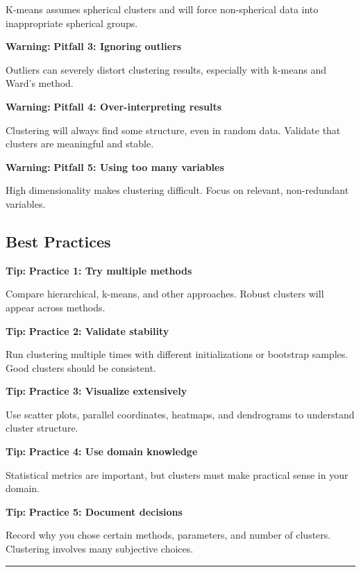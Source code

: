 \documentclass[
]{article}
\begin{document}
K-means assumes spherical clusters and will force non-spherical data
into inappropriate spherical groups.

\textbf{Warning: } \textbf{Pitfall 3: Ignoring outliers}

Outliers can severely distort clustering results, especially with
k-means and Ward's method.

\textbf{Warning: } \textbf{Pitfall 4: Over-interpreting results}

Clustering will always find some structure, even in random data.
Validate that clusters are meaningful and stable.

\textbf{Warning: } \textbf{Pitfall 5: Using too many variables}

High dimensionality makes clustering difficult. Focus on relevant,
non-redundant variables.

\textbf{ }

\subsection{Best Practices}

\textbf{Tip: } \textbf{Practice 1: Try multiple methods}

Compare hierarchical, k-means, and other approaches. Robust clusters
will appear across methods.

\textbf{Tip: } \textbf{Practice 2: Validate stability}

Run clustering multiple times with different initializations or
bootstrap samples. Good clusters should be consistent.

\textbf{Tip: } \textbf{Practice 3: Visualize extensively}

Use scatter plots, parallel coordinates, heatmaps, and dendrograms to
understand cluster structure.

\textbf{Tip: } \textbf{Practice 4: Use domain knowledge}

Statistical metrics are important, but clusters must make practical
sense in your domain.

\textbf{Tip: } \textbf{Practice 5: Document decisions}

Record why you chose certain methods, parameters, and number of
clusters. Clustering involves many subjective choices.

\begin{center}\rule{0.5\linewidth}{0.5pt}\end{center}

\textbf{ }
\end{document}
